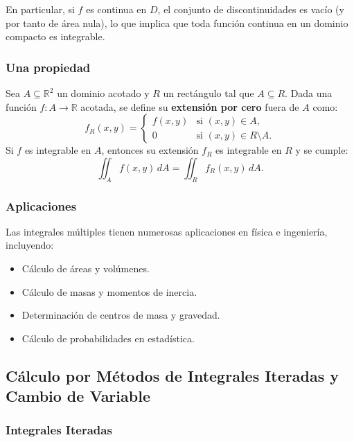 \documentclass[11pt]{book}
\theoremstyle{definicion}
\theoremstyle{teorema}
\theoremstyle{ejemplo}
\newtheorem{proposition}{Proposition}
\begin{document}
En particular, si \( f \) es continua en \( D \), el conjunto de discontinuidades es vacío (y por tanto de área nula),
lo que implica que toda función continua en un dominio compacto es integrable.

\subsubsection{Una propiedad}

Sea \( A \subseteq \mathbb{R}^2 \) un dominio acotado y \( R \) un rectángulo tal que \( A \subseteq R \).
Dada una función \( f: A \to \mathbb{R} \) acotada, se define su \textbf{extensión por cero} fuera de \( A \) como:
\[
f_R(x,y) =
\begin{cases}
f(x,y) & \text{si } (x,y) \in A, \\
0 & \text{si } (x,y) \in R \setminus A.
\end{cases}
\]
Si \( f \) es integrable en \( A \), entonces su extensión \( f_R \) es integrable en \( R \) y se cumple:
\[
\iint_A f(x,y) \, dA = \iint_R f_R(x,y) \, dA.
\]


\subsubsection{Aplicaciones}

\noindent Las integrales múltiples tienen numerosas aplicaciones en física e ingeniería, incluyendo:

\begin{itemize}
    \item Cálculo de áreas y volúmenes.
    \item Cálculo de masas y momentos de inercia.
    \item Determinación de centros de masa y gravedad.
    \item Cálculo de probabilidades en estadística.
\end{itemize}

\subsection{Cálculo por Métodos de Integrales Iteradas y Cambio de Variable}

\subsubsection{Integrales Iteradas}
\end{document}
